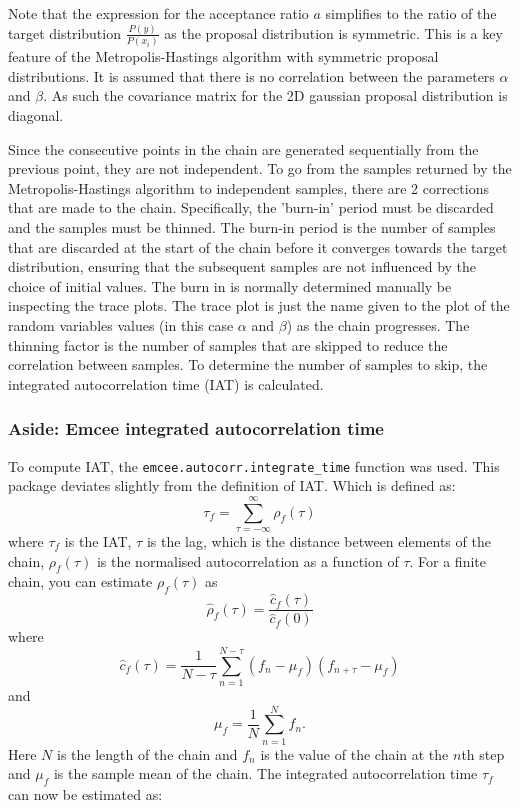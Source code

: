 \documentclass[11pt]{article}
\begin{document}
Note that the expression for the acceptance ratio $a$ simplifies to the ratio of the target distribution $\frac{P(y)}{P(x_i)}$ as the proposal distribution is symmetric. This is a key feature of the Metropolis-Hastings algorithm with symmetric proposal distributions. It is assumed that there is no correlation between the parameters $\alpha$ and $\beta$. As such the covariance matrix for the 2D gaussian proposal distribution is diagonal. 

Since the consecutive points in the chain are generated sequentially from the previous point, they are not independent. To go from the samples returned by the Metropolis-Hastings algorithm to independent samples, there are 2 corrections that are made to the chain. Specifically, the 'burn-in' period must be discarded and the samples must be thinned. 
The burn-in period is the number of samples that are discarded at the start of the chain before it converges towards the target distribution, ensuring that the subsequent samples are not influenced by the choice of initial values. The burn in is normally determined manually be inspecting the trace plots. The trace plot is just the name given to the plot of the random variables values (in this case $\alpha$ and $\beta$) as the chain progresses. 
The thinning factor is the number of samples that are skipped to reduce the correlation between samples. To determine the number of samples to skip, the integrated autocorrelation time (IAT) is calculated. 
\subsubsection{Aside: Emcee integrated autocorrelation time}
To compute IAT, the \texttt{emcee.autocorr.integrate\_time} function was used. 
This package deviates slightly from the definition of IAT. Which is defined as:
\begin{equation}
\tau_f = \sum_{\tau=-\infty}^{\infty} \rho_f(\tau)
\end{equation}
where  \(\tau_f\) is the IAT, \(\tau\) is the lag, which is the distance between elements of the chain, \(\rho_f(\tau)\) is the normalised autocorrelation as a function of \(\tau\). For a finite chain, you can estimate \(\rho_f(\tau)\) as
\begin{equation}
\hat{\rho}_f(\tau) = \frac{\hat{c}_f(\tau)}{\hat{c}_f(0)}
\end{equation}
where
\begin{equation}
\hat{c}_f(\tau) = \frac{1}{N - \tau} \sum_{n=1}^{N-\tau} (f_n - \mu_f) (f_{n+\tau} - \mu_f)
\end{equation}
and
\begin{equation}
\mu_f = \frac{1}{N} \sum_{n=1}^{N} f_n.
\end{equation}
Here \(N\) is the length of the chain and \(f_n\) is the value of the chain at the \(n\)th step and \(\mu_f\) is the sample mean of the chain. The integrated autocorrelation time \(\tau_f\) can now be estimated as:
\end{document}
